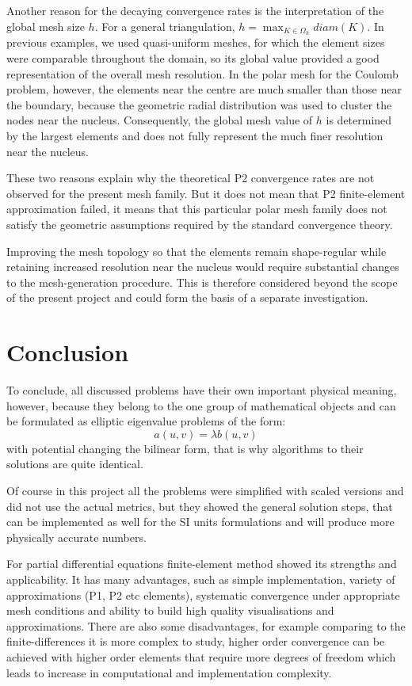 \documentclass[acmsmall,screen]{MapleTrans}
\begin{document}
Another reason for the decaying convergence rates is the interpretation of the global mesh size $h$. For a general triangulation, $h = \max_{K \in \Omega_h}diam(K)$. In previous examples, we used quasi-uniform meshes, for which the element sizes were comparable throughout the domain, so its global value provided a good representation of the overall mesh resolution. In the polar mesh for the Coulomb problem, however, the elements near the centre are much smaller than those near the boundary, because the geometric radial distribution was used to cluster the nodes near the nucleus. Consequently, the global mesh value of $h$ is determined by the largest elements and does not fully represent the much finer resolution near the nucleus.

These two reasons explain why the theoretical P2 convergence rates are not observed for the present mesh family. But it does not mean that P2 finite-element approximation failed, it means that this particular polar mesh family does not satisfy the geometric assumptions required by the standard convergence theory.

Improving the mesh topology so that the elements remain shape-regular while retaining increased resolution near the nucleus would require substantial changes to the mesh-generation procedure. This is therefore considered beyond the scope of the present project and could form the basis of a separate investigation.


\section{Conclusion}
To conclude, all discussed problems have their own important physical meaning, however, because they belong to the one group of mathematical objects and can be formulated as elliptic eigenvalue problems of the form:
\begin{equation}
    a(u, v) = \lambda b(u, v)
\end{equation}
with potential changing the bilinear form, that is why algorithms to their solutions are quite identical. 

Of course in this project all the problems were simplified with scaled versions and did not use the actual metrics, but they showed the general solution steps, that can be implemented as well for the SI units formulations and will produce more physically accurate numbers.

For partial differential equations finite-element method showed its strengths and applicability. It has many advantages, such as simple implementation, variety of approximations (P1, P2 etc elements), systematic convergence under appropriate mesh conditions and ability to build high quality visualisations and approximations. There are also some disadvantages, for example comparing to the finite-differences it is more complex to study, higher order convergence can be achieved with higher order elements that require more degrees of freedom which leads to increase in computational and implementation complexity.
\end{document}
